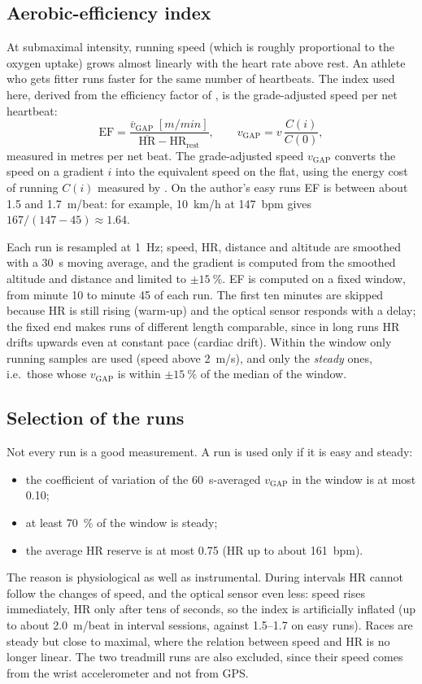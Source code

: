 \documentclass[11pt,a4paper]{article}
\begin{document}
\subsection{Aerobic-efficiency index}
At submaximal intensity, running speed (which is roughly proportional to the
oxygen uptake) grows almost linearly with the heart rate above rest. An athlete
who gets fitter runs faster for the same number of heartbeats. The index used
here, derived from the efficiency factor of \citet{allen2019}, is the
grade-adjusted speed per net heartbeat:
\begin{equation}
\mathrm{EF} = \frac{\overline{v}_{\mathrm{GAP}}\;[\si{m/min}]}{\overline{\mathrm{HR}} - \mathrm{HR_{rest}}},
\qquad
v_{\mathrm{GAP}} = v\, \frac{C(i)}{C(0)},
\label{eq:ef}
\end{equation}
measured in metres per net beat. The grade-adjusted speed $v_{\mathrm{GAP}}$
converts the speed on a gradient $i$ into the equivalent speed on the flat,
using the energy cost of running $C(i)$ measured by \citet{minetti2002}. On the
author's easy runs EF is between about 1.5 and \SI{1.7}{m/beat}: for example,
\SI{10}{km/h} at \SI{147}{bpm} gives $167/(147-45) \approx 1.64$.

Each run is resampled at \SI{1}{Hz}; speed, HR, distance and altitude are
smoothed with a \SI{30}{s} moving average, and the gradient is computed from
the smoothed altitude and distance and limited to $\pm\SI{15}{\percent}$. EF is
computed on a fixed window, from minute 10 to minute 45 of each run. The first
ten minutes are skipped because HR is still rising (warm-up) and the optical
sensor responds with a delay; the fixed end makes runs of different length
comparable, since in long runs HR drifts upwards even at constant pace
(cardiac drift). Within the window only running samples are used (speed above
\SI{2}{m/s}), and only the \emph{steady} ones, i.e.\ those whose $v_{\mathrm{GAP}}$
is within $\pm\SI{15}{\percent}$ of the median of the window.

\subsection{Selection of the runs}
Not every run is a good measurement. A run is used only if it is easy and
steady:
\begin{itemize}
  \item the coefficient of variation of the \SI{60}{s}-averaged
  $v_{\mathrm{GAP}}$ in the window is at most 0.10;
  \item at least \SI{70}{\percent} of the window is steady;
  \item the average HR reserve is at most 0.75 (HR up to about \SI{161}{bpm}).
\end{itemize}
The reason is physiological as well as instrumental. During intervals HR
cannot follow the changes of speed, and the optical sensor even less: speed
rises immediately, HR only after tens of seconds, so the index is artificially
inflated (up to about \SI{2.0}{m/beat} in interval sessions, against 1.5--1.7
on easy runs). Races are steady but close to maximal, where the relation
between speed and HR is no longer linear. The two treadmill runs are also
excluded, since their speed comes from the wrist accelerometer and not from
GPS.
\end{document}
